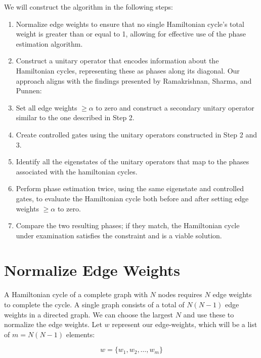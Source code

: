 \documentclass[msc,oneside]{ubcthesis}
\begin{document}
	We will construct the algorithm in the following steps:
	\begin{enumerate}
		\item Normalize edge weights to ensure that no single Hamiltonian cycle's total weight is greater than or equal to 1, allowing for effective use of the phase estimation algorithm.\\
		\item Construct a unitary operator that encodes information about the Hamiltonian cycles, representing these as phases along its diagonal. Our approach aligns with the findings presented by Ramakrishnan, Sharma, and Punnen: \cite{srinivasan2018efficient}\\
		\item Set all edge weights $\geq \alpha$ to zero and construct a secondary unitary operator similar to the one described in Step 2.\\
		\item Create controlled gates using the unitary operators constructed in Step 2 and 3.\\
		\item Identify all the eigenstates of the unitary operators that map to the phases associated with the hamiltonian cycles.\\
		\item Perform phase estimation twice, using the same eigenstate and controlled gates, to evaluate the Hamiltonian cycle both before and after setting edge weights $\geq \alpha$ to zero.\\
		\item Compare the two resulting phases; if they match, the Hamiltonian cycle under examination satisfies the constraint and is a viable solution.\\
		
	\end{enumerate}
		
	\section{Normalize Edge Weights}
	
		A Hamiltonian cycle of a complete graph with $N$ nodes requires $N$ edge weights to complete the cycle. A single graph consists of a total of $N(N-1)$ edge weights in a directed graph. We can choose the largest $N$ and use these to normalize the edge weights. Let $w$ represent our edge-weights, which will be a list of $m = N(N-1)$ elements:
	
	$$w = \{w_1, w_2, \ldots, w_m\}$$ 
	
\end{document}
